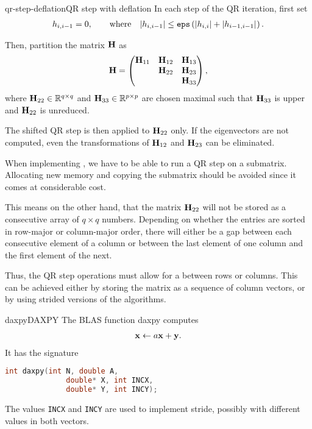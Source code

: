 \begin{Algorithm*}{qr-step-deflation}{QR step with deflation}
  In each step of the QR iteration, first set
  \begin{gather}
    h_{i,i-1} = 0, \qquad \text{where}\quad
    \lvert h_{i,i-1}\rvert \le \texttt{eps} \left(\lvert h_{i,i}\rvert+\lvert h_{i-1,i-1}\rvert_{\vphantom{g}}\right).
  \end{gather}

  Then, partition the matrix
  $\mathbf H$ as
  \begin{gather}
    \mathbf H =
    \begin{pmatrix}
      \mathbf H_{11} & \mathbf H_{12} & \mathbf H_{13} \\
      & \mathbf H_{22} & \mathbf H_{23}\\
      && \mathbf H_{33}
    \end{pmatrix},
  \end{gather}
  where $\mathbf H_{22}\in\mathbb R^{q\times q}$ and
  $\mathbf H_{33}\in\mathbb R^{p\times p}$ are chosen maximal such that
  $\mathbf H_{33}$ is upper  and $\mathbf H_{22}$
  is unreduced.

  The shifted QR step is then applied to $\mathbf H_{22}$ only. If the
  eigenvectors are not computed, even the transformations of
  $\mathbf H_{12}$ and $\mathbf H_{23}$ can be eliminated.
\end{Algorithm*}

\begin{remark}
  When implementing , we have
  to be able to run a QR step on a submatrix. Allocating new memory
  and copying the submatrix should be avoided since it comes at
  considerable cost.

  This means on the other hand, that the matrix $\mathbf H_{22}$ will not
  be stored as a consecutive array of $q\times q$ numbers. Depending
  on whether the entries are sorted in row-major or column-major
  order, there will either be a gap between each consecutive element
  of a column or between the last element of one column and the first
  element of the next.

  Thus, the QR step operations must allow for a 
  between rows or columns. This can be achieved either by storing the
  matrix as a sequence of column vectors, or by using strided versions
  of the algorithms.
\end{remark}

\begin{Example*}{daxpy}{DAXPY}
  The BLAS function daxpy computes
  \begin{gather}
    \mathbf x \gets a \mathbf x + \mathbf y.
  \end{gather}
  It has the signature
  \begin{lstlisting}[language=c]
    int daxpy(int N, double A,
              double* X, int INCX,
              double* Y, int INCY);
  \end{lstlisting}
  The values \lstinline!INCX! and \lstinline!INCY! are used to
  implement stride, possibly with different values in both vectors.
\end{Example*}

